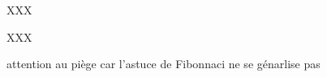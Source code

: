 XXX


%
                 {\intertreethree}{\prodderthree}



XXX

attention au piège car l'astuce de Fibonnaci ne se génarlise pas 

%
                 {\intertreethree}{}